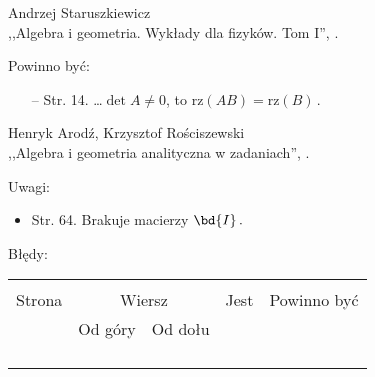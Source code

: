 \begin{center}
  Andrzej Staruszkiewicz \\
  ,,Algebra i geometria. Wykłady dla fizyków. Tom I'', \cite{ASAG}.
\end{center}


Powinno być:
\begin{itemize}
\item[--] Str. 14. \ldots $\det A \neq 0$, to $\textrm{rz} ( AB ) =
  \textrm{rz} ( B ) \, .$
\end{itemize}


\begin{center}
  Henryk Arodź, Krzysztof Rościszewski\\
  ,,Algebra i geometria analityczna w zadaniach'', \cite{AR}.
\end{center}


Uwagi:
\begin{itemize}
\item Str. 64. Brakuje macierzy $\bd{I} \, .$
\end{itemize}

Błędy:\\
\begin{tabular}{|c|c|c|c|c|}
  \hline
  & \multicolumn{2}{c|}{} & & \\
  Strona & \multicolumn{2}{c|}{Wiersz}& Jest & Powinno być \\ \cline{2-3}
  & Od góry & Od dołu &  &  \\ \hline
  & & & & \\
  & & & & \\
  & & & & \\
  & & & & \\ \hline
\end{tabular}


